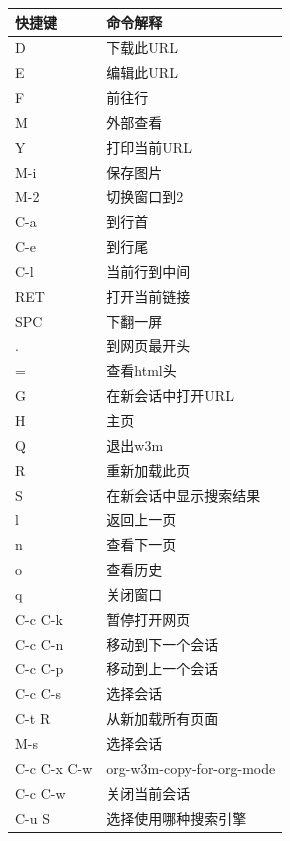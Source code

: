 \documentclass[11pt]{article}
\begin{document}
\begin{center}
\begin{tabular}{ll}
 快捷键       &  命令解释                   \\
\hline
 D            &  下载此URL                  \\
 E            &  编辑此URL                  \\
 F            &  前往行                     \\
 M            &  外部查看                   \\
 Y            &  打印当前URL                \\
 M-i          &  保存图片                   \\
 M-2          &  切换窗口到2                \\
 C-a          &  到行首                     \\
 C-e          &  到行尾                     \\
 C-l          &  当前行到中间               \\
 RET          &  打开当前链接               \\
 SPC          &  下翻一屏                   \\
 .            &  到网页最开头               \\
 =            &  查看html头                 \\
 G            &  在新会话中打开URL          \\
 H            &  主页                       \\
 Q            &  退出w3m                    \\
 R            &  重新加载此页               \\
 S            &  在新会话中显示搜索结果     \\
 l            &  返回上一页                 \\
 n            &  查看下一页                 \\
 o            &  查看历史                   \\
 q            &  关闭窗口                   \\
 C-c C-k      &  暂停打开网页               \\
 C-c C-n      &  移动到下一个会话           \\
 C-c C-p      &  移动到上一个会话           \\
 C-c C-s      &  选择会话                   \\
 C-t R        &  从新加载所有页面           \\
 M-s          &  选择会话                   \\
 C-c C-x C-w  &  org-w3m-copy-for-org-mode  \\
 C-c C-w      &  关闭当前会话               \\
 C-u S        &  选择使用哪种搜索引擎       \\
\end{tabular}
\end{center}
\end{document}
